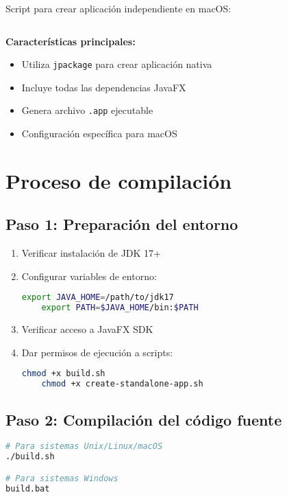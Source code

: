 Script para crear aplicación independiente en macOS:

\inputminted[linenos,breaklines]{bash}{codigo/create-standalone-app.sh}

\textbf{Características principales:}

\begin{itemize}
    \item Utiliza \texttt{jpackage} para crear aplicación nativa
    \item Incluye todas las dependencias JavaFX
    \item Genera archivo \texttt{.app} ejecutable
    \item Configuración específica para macOS
\end{itemize}

\section{Proceso de compilación}

\subsection{Paso 1: Preparación del entorno}

\begin{enumerate}
    \item Verificar instalación de JDK 17+
    \item Configurar variables de entorno:
    \begin{lstlisting}[language=bash]
    export JAVA_HOME=/path/to/jdk17
    export PATH=$JAVA_HOME/bin:$PATH
    \end{lstlisting}
    \item Verificar acceso a JavaFX SDK
    \item Dar permisos de ejecución a scripts:
    \begin{lstlisting}[language=bash]
    chmod +x build.sh
    chmod +x create-standalone-app.sh
    \end{lstlisting}
\end{enumerate}

\subsection{Paso 2: Compilación del código fuente}

\begin{lstlisting}[language=bash, caption=Compilación del proyecto]
# Para sistemas Unix/Linux/macOS
./build.sh

# Para sistemas Windows
build.bat
\end{lstlisting}

